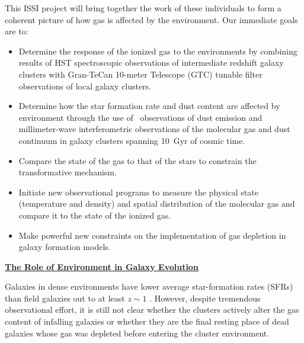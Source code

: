 \documentclass[11pt]{article}
\begin{document}
This ISSI project will bring together the work of these individuals to
form a coherent picture of how gas is affected by the environment.
Our immediate goals are to:
\vspace{-0.15in}
\begin{itemize}
\item Determine the response of the ionized gas to the environments by
  combining results of HST spectroscopic observations of intermediate redshift
  galaxy clusters with Gran-TeCan 10-meter Telescope (GTC) tunable filter
  observations of local galaxy clusters.
\vspace{-0.1in}
\item Determine how the star formation rate and dust content are
  affected by environment through the use of \spitzer\ observations of
  dust emission and millimeter-wave interferometric observations of
  the molecular gas and dust continuum in galaxy clusters spanning 10~Gyr of
  cosmic time.
\vspace{-0.1in}
\item Compare the state of the gas to that of the stars to constrain
  the transformative mechanism.
\vspace{-0.1in}
\item Initiate new observational programs to measure the physical
  state (temperature and density) and spatial distribution of the
  molecular gas and compare it to the state of the ionized gas.
\vspace{-0.1in}
\item Make powerful new constraints on the implementation of gas
  depletion in galaxy formation models.
\end{itemize}
\vspace{-0.1in}

\centerline{{\bf \underline{ The Role of Environment in Galaxy Evolution}}}
\medskip

 Galaxies in dense environments
have lower average star-formation rates (SFRs) than field galaxies out
to at least $z \sim 1$ \citep[e.g.][]{Poggianti99,Lewis02,Gomez03,Postman05}.
However, despite tremendous observational effort, it
is still not clear whether the clusters actively alter the gas content
of infalling galaxies or whether they are the final resting place of
dead galaxies whose gas was depleted before entering the cluster
environment.
\end{document}
